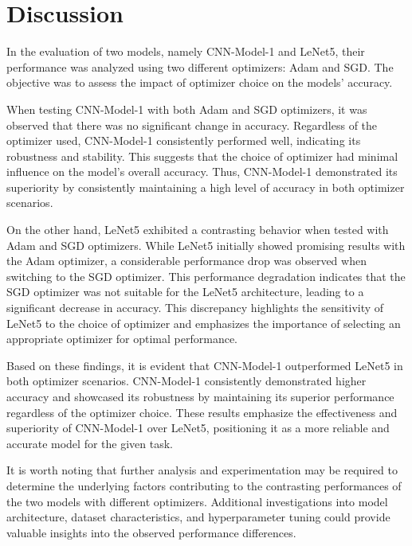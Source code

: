\clearpage

\section{Discussion}

In the evaluation of two models, namely CNN-Model-1 and LeNet5, their performance was analyzed using two different optimizers: Adam and SGD. The objective was to assess the impact of optimizer choice on the models' accuracy.

\noindent When testing CNN-Model-1 with both Adam and SGD optimizers, it was observed that there was no significant change in accuracy. Regardless of the optimizer used, CNN-Model-1 consistently performed well, indicating its robustness and stability. This suggests that the choice of optimizer had minimal influence on the model's overall accuracy. Thus, CNN-Model-1 demonstrated its superiority by consistently maintaining a high level of accuracy in both optimizer scenarios.

\noindent On the other hand, LeNet5 exhibited a contrasting behavior when tested with Adam and SGD optimizers. While LeNet5 initially showed promising results with the Adam optimizer, a considerable performance drop was observed when switching to the SGD optimizer. This performance degradation indicates that the SGD optimizer was not suitable for the LeNet5 architecture, leading to a significant decrease in accuracy. This discrepancy highlights the sensitivity of LeNet5 to the choice of optimizer and emphasizes the importance of selecting an appropriate optimizer for optimal performance.

\noindent Based on these findings, it is evident that CNN-Model-1 outperformed LeNet5 in both optimizer scenarios. CNN-Model-1 consistently demonstrated higher accuracy and showcased its robustness by maintaining its superior performance regardless of the optimizer choice. These results emphasize the effectiveness and superiority of CNN-Model-1 over LeNet5, positioning it as a more reliable and accurate model for the given task.

\noindent It is worth noting that further analysis and experimentation may be required to determine the underlying factors contributing to the contrasting performances of the two models with different optimizers. Additional investigations into model architecture, dataset characteristics, and hyperparameter tuning could provide valuable insights into the observed performance differences.

% 